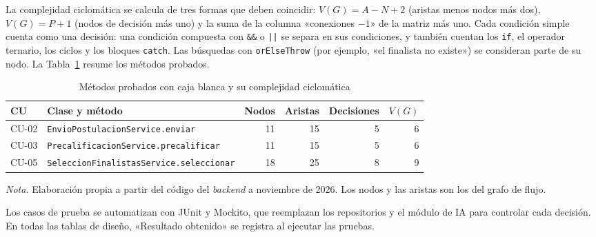 La complejidad ciclomática se calcula de tres formas que deben coincidir: $V(G)=A-N+2$ (aristas menos nodos más dos), $V(G)=P+1$ (nodos de decisión más uno) y la suma de la columna «conexiones $-1$» de la matriz más uno. Cada condición simple cuenta como una decisión: una condición compuesta con \texttt{\&\&} o \texttt{||} se separa en sus condiciones, y también cuentan los \texttt{if}, el operador ternario, los ciclos y los bloques \texttt{catch}. Las búsquedas con \texttt{orElseThrow} (por ejemplo, «el finalista no existe») se consideran parte de su nodo. La Tabla~\ref{tab:cb_vg} resume los métodos probados.

\begin{table}[H]
\centering
\caption{Métodos probados con caja blanca y su complejidad ciclomática}
\label{tab:cb_vg}
\small
\begin{tabular}{@{}p{1.3cm}p{5.6cm}rrrr@{}}
\toprule
\textbf{CU} & \textbf{Clase y método} & \textbf{Nodos} & \textbf{Aristas} & \textbf{Decisiones} & \textbf{$V(G)$} \\
\midrule
CU-02 & \texttt{EnvioPostulacionService.enviar} & 11 & 15 & 5 & 6 \\
CU-03 & \texttt{PrecalificacionService.precalificar} & 11 & 15 & 5 & 6 \\
CU-05 & \texttt{SeleccionFinalistasService.seleccionar} & 18 & 25 & 8 & 9 \\
\bottomrule
\end{tabular}

\vspace{2pt}
\footnotesize\textit{Nota.} Elaboración propia a partir del código del \textit{backend} a noviembre de 2026. Los nodos y las aristas son los del grafo de flujo.
\end{table}

Los casos de prueba se automatizan con JUnit y Mockito, que reemplazan los repositorios y el módulo de IA para controlar cada decisión. En todas las tablas de diseño, «Resultado obtenido» se registra al ejecutar las pruebas.

\newcommand{\fcpitch}{1.7}
\newcommand{\fcp}[4]{\node[fcp] (f#1) at (#2,{-#3*\fcpitch}) {\textbf{#1}.\ #4};}
\newcommand{\fcs}[4]{\node[fcs] (f#1) at (#2,{-#3*\fcpitch}) {\textbf{#1}.\ #4};}
\newcommand{\fcd}[4]{\node[fcd] (f#1) at (#2,{-#3*\fcpitch}) {\textbf{#1}.\ #4};}
\newcommand{\fct}[3]{\node[fct] (f#1) at (#2,{-#3*\fcpitch}) {\textbf{#1}.\ Fin};}
\newcommand{\cgn}[5]{\node[#4] (g#1) at (#2,{-#3*1.25}) {#5};}


